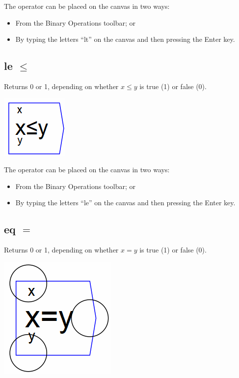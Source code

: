 The operator can be placed on the canvas in two ways:

\begin{itemize}
\item From the Binary Operations toolbar; or
\item By typing the letters ``lt'' on the canvas and then pressing the Enter key.
\end{itemize}


\subsection{le $\le$}\label{Operation:le} Returns 0 or 1, depending on
whether $x\le y$ is true (1) or false (0).

\includegraphics{images/LessEqualKey.png} 

The operator can be placed on the canvas in two ways:

\begin{itemize}
\item From the Binary Operations toolbar; or
\item By typing the letters ``le'' on the canvas and then pressing the
  Enter key.
\end{itemize}


\subsection{eq $=$}\label{Operation:eq} Returns 0 or 1, depending on
whether $x=y$ is true (1) or false (0).

\includegraphics{images/EqualKey.png} 

